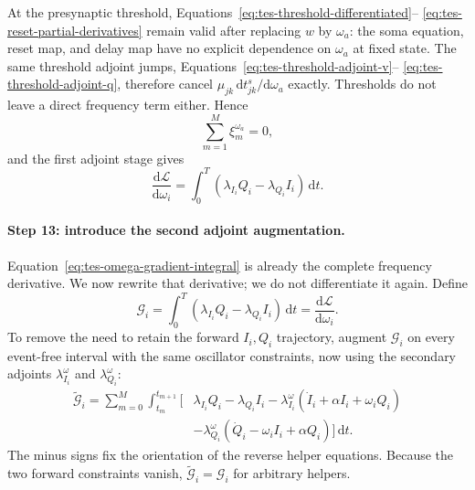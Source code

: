 At the presynaptic threshold, Equations~\eqref{eq:tes-threshold-differentiated}--
\eqref{eq:tes-reset-partial-derivatives} remain valid after replacing
$w$ by $\omega_a$: the soma equation, reset map, and delay map have no
explicit dependence on $\omega_a$ at fixed state. The same threshold adjoint
jumps, Equations~\eqref{eq:tes-threshold-adjoint-v}--
\eqref{eq:tes-threshold-adjoint-q}, therefore cancel
$\mu_{jk}\,\mathrm dt^s_{jk}/\mathrm d\omega_a$ exactly. Thresholds do not
leave a direct frequency term either. Hence
\begin{equation}
    \sum_{m=1}^{M}\xi_m^{\omega_a}=0,
\end{equation}
and the first adjoint stage gives
\begin{equation}
    \frac{\mathrm d\mathcal L}{\mathrm d\omega_i}
      =\int_0^T
        \left(\lambda_{I_i}Q_i-\lambda_{Q_i}I_i\right)\,\mathrm dt.
    \label{eq:tes-omega-gradient-integral}
\end{equation}

\paragraph{Step 13: introduce the second adjoint augmentation.}
Equation~\eqref{eq:tes-omega-gradient-integral} is already the complete
frequency derivative. We now rewrite that derivative; we do not differentiate
it again. Define
\begin{equation}
    \mathcal G_i
      =\int_0^T
        \left(\lambda_{I_i}Q_i-\lambda_{Q_i}I_i\right)\,\mathrm dt
      =\frac{\mathrm d\mathcal L}{\mathrm d\omega_i}.
\end{equation}
To remove the need to retain the forward $I_i,Q_i$ trajectory, augment
$\mathcal G_i$ on every event-free interval with the same oscillator
constraints, now using the secondary adjoints
$\lambda_{I_i}^{\omega}$ and $\lambda_{Q_i}^{\omega}$:
\begin{align}
    \widetilde{\mathcal G}_i
      =\sum_{m=0}^{M}\int_{t_m}^{t_{m+1}}
       \Big[
        &\lambda_{I_i}Q_i-\lambda_{Q_i}I_i
        -\lambda_{I_i}^{\omega}
          (\dot I_i+\alpha I_i+\omega_iQ_i)
        \nonumber\\
        &-\lambda_{Q_i}^{\omega}
          (\dot Q_i-\omega_iI_i+\alpha Q_i)
       \Big]\,\mathrm dt.
    \label{eq:tes-omega-second-augmented-functional}
\end{align}
The minus signs fix the orientation of the reverse helper equations. Because
the two forward constraints vanish,
$\widetilde{\mathcal G}_i=\mathcal G_i$ for arbitrary helpers.

